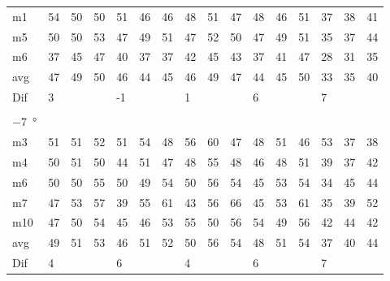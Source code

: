 \begin{table}[H]
\begin{tabular}{l|l|l|l|l|l|l|l|l|l|l|l|l|lll}
m1    & 54     &   50   &    50  &  51    &  46    &  46    &  48    &    51   &  47    &  48     & 46     &  51    & \multicolumn{1}{l|}{37} & \multicolumn{1}{l|}{38} & 41 \\
m5    &  50    &   50   &   53   &  47    &   49   &  51    &   47   &   52    &  50    &  47     &  49    &  51    & \multicolumn{1}{l|}{35} & \multicolumn{1}{l|}{37} & 44 \\
m6    &  37    &   45   &   47   &   40   &   37   &  37    &  42    &   45    &   43   &   37    &  41    &   47   & \multicolumn{1}{l|}{28} & \multicolumn{1}{l|}{31} & 35 \\ \hline
avg   &  47    &  49    &  50    &  46    &   44   &   45   &  46    &  49     &  47    &  44     &  45    &   50   & \multicolumn{1}{l|}{33} & \multicolumn{1}{l|}{35}  &  40 \\ \hline 
Dif & \multicolumn{3}{l|}{3} & \multicolumn{3}{l|}{-1} & \multicolumn{3}{l|}{1} & \multicolumn{3}{l|}{6} & \multicolumn{3}{l}{7} \\ 
 \multicolumn{16}{l}{ } \\   
\SI{-7}{\degree}   & \multicolumn{3}{l|}{} & \multicolumn{3}{l|}{} & \multicolumn{3}{l|}{} & \multicolumn{3}{l|}{} & \multicolumn{3}{l}{}   \\  \hline
m3    & 51     & 51     &   52   &   51   &   54   &  48    &  56    &   60    &  47    &   48    &  51    &  46    & \multicolumn{1}{l|}{53} & \multicolumn{1}{l|}{37} & 38 \\
m4    &  50    &  51    &  50    &  44    &   51   &  47    &  48    &  55     &   48   &   46    &  48    &   51   & \multicolumn{1}{l|}{39} & \multicolumn{1}{l|}{37} & 42 \\
m6    &  50    &  50    &   55   &   50   &   49   &  54    &  50    &   56    &   54   &   45    & 53     &  54    & \multicolumn{1}{l|}{34} & \multicolumn{1}{l|}{45} & 44 \\
m7    &  47    &  53    &  57    &   39   &   55   &  61    &  43    &   56    &   66   &   45    &   53   &  61    & \multicolumn{1}{l|}{35} & \multicolumn{1}{l|}{39} &  52\\
m10  &  47    &   50   &   54   &   45   &   46   &  53    &  55    &   50    &   56   &  54     &   49   &   56   & \multicolumn{1}{l|}{42} & \multicolumn{1}{l|}{44} &  42\\ \hline
avg   &   49   &   51   & 53     &   46   &    51  & 52     &  50    &   56    &   54   &   48    &   51   &  54    & \multicolumn{1}{l|}{37} & \multicolumn{1}{l|}{40}  & 44  \\ \hline 
Dif & \multicolumn{3}{l|}{4} & \multicolumn{3}{l|}{6} & \multicolumn{3}{l|}{4} & \multicolumn{3}{l|}{6} & \multicolumn{3}{l}{7}    
\end{tabular}
\end{table}



